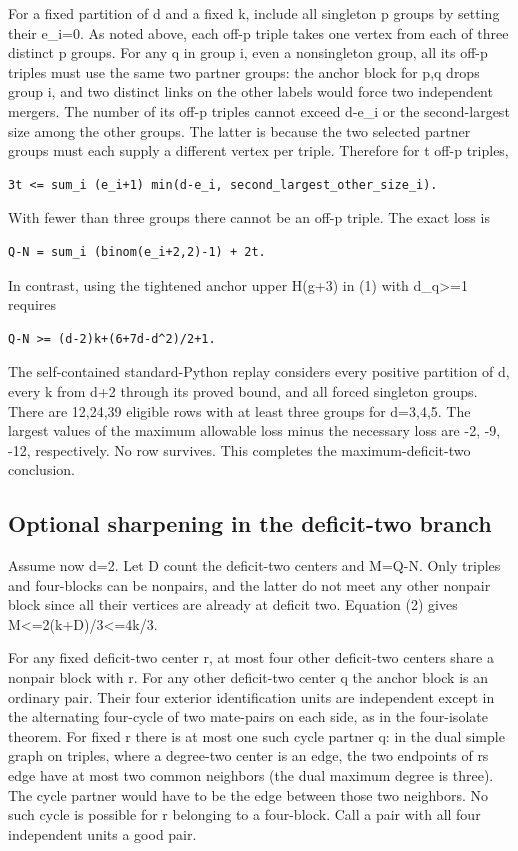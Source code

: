 \documentclass[11pt,letterpaper]{article}
\begin{document}
For a fixed partition of d and a fixed k, include all singleton p groups
by setting their e\_i=0. As noted above, each off-p triple takes one
vertex from each of three distinct p groups. For any q in group i, even
a nonsingleton group, all its off-p triples must use the same two
partner groups: the anchor block for p,q drops group i, and two distinct
links on the other labels would force two independent mergers. The
number of its off-p triples cannot exceed d-e\_i or the second-largest
size among the other groups. The latter is because the two selected
partner groups must each supply a different vertex per triple. Therefore
for t off-p triples,

\begin{verbatim}
3t <= sum_i (e_i+1) min(d-e_i, second_largest_other_size_i).
\end{verbatim}

With fewer than three groups there cannot be an off-p triple. The exact
loss is

\begin{verbatim}
Q-N = sum_i (binom(e_i+2,2)-1) + 2t.
\end{verbatim}

In contrast, using the tightened anchor upper H(g+3) in (1) with d\_q>=1
requires

\begin{verbatim}
Q-N >= (d-2)k+(6+7d-d^2)/2+1.
\end{verbatim}

The self-contained standard-Python replay considers every positive
partition of d, every k from d+2 through its proved bound, and all
forced singleton groups. There are 12,24,39 eligible rows with at least
three groups for d=3,4,5. The largest values of the maximum allowable
loss minus the necessary loss are -2, -9, -12, respectively. No row
survives. This completes the maximum-deficit-two conclusion.

\subsection{Optional sharpening in the deficit-two
branch}\label{optional-sharpening-in-the-deficit-two-branch}

Assume now d=2. Let D count the deficit-two centers and M=Q-N. Only
triples and four-blocks can be nonpairs, and the latter do not meet any
other nonpair block since all their vertices are already at deficit two.
Equation (2) gives M<=2(k+D)/3<=4k/3.

For any fixed deficit-two center r, at most four other deficit-two
centers share a nonpair block with r. For any other deficit-two center q
the anchor block is an ordinary pair. Their four exterior identification
units are independent except in the alternating four-cycle of two
mate-pairs on each side, as in the four-isolate theorem. For fixed r
there is at most one such cycle partner q: in the dual simple graph on
triples, where a degree-two center is an edge, the two endpoints of
r\textquotesingle s edge have at most two common neighbors (the dual
maximum degree is three). The cycle partner would have to be the edge
between those two neighbors. No such cycle is possible for r belonging
to a four-block. Call a pair with all four independent units a good
pair.
\end{document}

